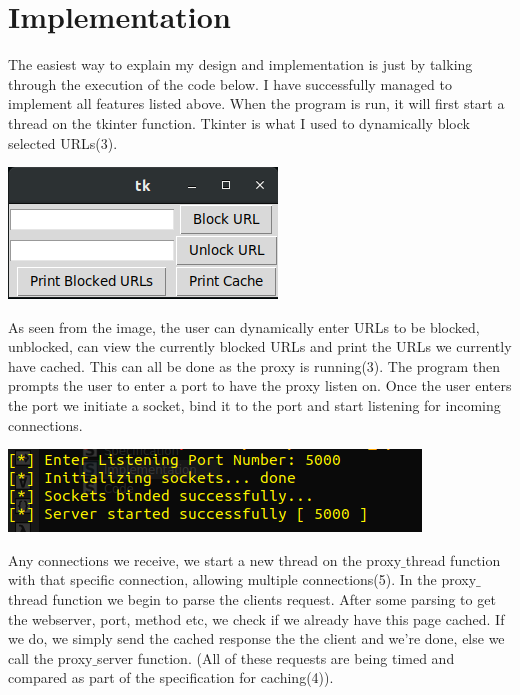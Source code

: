 \documentclass[12pt]{report}
\begin{document}
\section{Implementation}
The easiest way to explain my design and implementation is just by talking through the execution of the code below. I have successfully managed to implement all features listed above. 
\newline
When the program is run, it will first start a thread on the tkinter function. Tkinter is what I used to dynamically block selected URLs(3).
\begin{center}
\includegraphics[scale=0.5]{tkinter.png}
\end{center}
As seen from the image, the user can dynamically enter URLs to be blocked, unblocked, can view the currently blocked URLs and print the URLs we currently have cached. This can all be done as the proxy is running(3).
\newline
The program then prompts the user to enter a port to have the proxy listen on. Once the user enters the port we initiate a socket, bind it to the port and start listening for incoming connections.
\begin{center}
\includegraphics[scale=0.5]{beginning.png}
\end{center} 
Any connections we receive, we start a new thread on the proxy$\_$thread function with that specific connection, allowing multiple connections(5). 
\newline
In the proxy$\_$thread function we begin to parse the clients request. After some parsing to get the webserver, port, method etc, we check if we already have this page cached. If we do, we simply send the cached response the the client and we're done, else we call the proxy$\_$server function. (All of these requests are being timed and compared as part of the specification for caching(4)).
\newline
\end{document}

